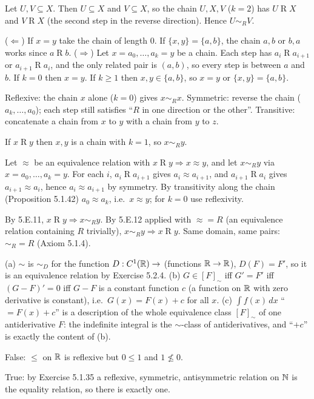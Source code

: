  Let $U,V\subseteq X$. Then $U\subseteq X$ and $V\subseteq X$, so the chain $U,X,V$ ($k=2$) has $U\mathrel RX$ and $V\mathrel RX$ (the second step in the reverse direction). Hence $U\sim_RV$.

 ($\Leftarrow$) If $x=y$ take the chain of length $0$. If $\{x,y\}=\{a,b\}$, the chain $a,b$ or $b,a$ works since $a\mathrel Rb$. ($\Rightarrow$) Let $x=a_0,\dots,a_k=y$ be a chain. Each step has $a_i\mathrel Ra_{i+1}$ or $a_{i+1}\mathrel Ra_i$, and the only related pair is $(a,b)$, so every step is between $a$ and $b$. If $k=0$ then $x=y$. If $k\ge1$ then $x,y\in\{a,b\}$, so $x=y$ or $\{x,y\}=\{a,b\}$.

 Reflexive: the chain $x$ alone ($k=0$) gives $x\sim_Rx$. Symmetric: reverse the chain ($a_k,\dots,a_0$); each step still satisfies ``$R$ in one direction or the other''. Transitive: concatenate a chain from $x$ to $y$ with a chain from $y$ to $z$.

 If $x\mathrel Ry$ then $x,y$ is a chain with $k=1$, so $x\sim_Ry$.

 Let $\approx$ be an equivalence relation with $x\mathrel Ry\Rightarrow x\approx y$, and let $x\sim_Ry$ via $x=a_0,\dots,a_k=y$. For each $i$, $a_i\mathrel Ra_{i+1}$ gives $a_i\approx a_{i+1}$, and $a_{i+1}\mathrel Ra_i$ gives $a_{i+1}\approx a_i$, hence $a_i\approx a_{i+1}$ by symmetry. By transitivity along the chain (Proposition 5.1.42) $a_0\approx a_k$, i.e.\ $x\approx y$; for $k=0$ use reflexivity.

 By 5.E.11, $x\mathrel Ry\Rightarrow x\sim_Ry$. By 5.E.12 applied with $\approx=R$ (an equivalence relation containing $R$ trivially), $x\sim_Ry\Rightarrow x\mathrel Ry$. Same domain, same pairs: $\sim_R=R$ (Axiom 5.1.4).

 (a) $\sim$ is $\sim_D$ for the function $D:C^1(\mathbb{R})\to$ (functions $\mathbb{R}\to\mathbb{R}$), $D(F)=F'$, so it is an equivalence relation by Exercise 5.2.4. (b) $G\in[F]_\sim$ iff $G'=F'$ iff $(G-F)'=0$ iff $G-F$ is a constant function $c$ (a function on $\mathbb{R}$ with zero derivative is constant), i.e.\ $G(x)=F(x)+c$ for all $x$. (c) $\int f(x)\,dx$ ``$=F(x)+c$'' is a description of the whole equivalence class $[F]_\sim$ of one antiderivative $F$: the indefinite integral is the $\sim$-class of antiderivatives, and ``$+c$'' is exactly the content of (b).

 False: $\le$ on $\mathbb{R}$ is reflexive but $0\le1$ and $1\not\le0$.

 True: by Exercise 5.1.35 a reflexive, symmetric, antisymmetric relation on $\mathbb{N}$ is the equality relation, so there is exactly one.

